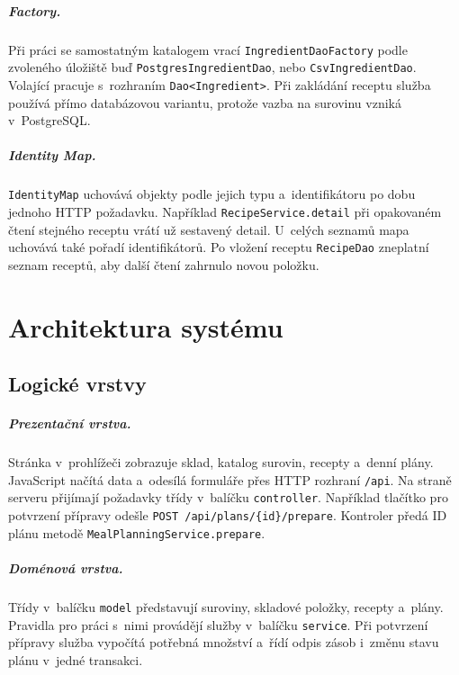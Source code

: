\documentclass[11pt,a4paper,oneside]{report}
\begin{document}
\paragraph{Factory.}
Při práci se samostatným katalogem vrací \texttt{IngredientDaoFactory}
podle zvoleného úložiště buď \texttt{PostgresIngredientDao}, nebo
\texttt{CsvIngredientDao}. Volající pracuje s~rozhraním
\texttt{Dao\textless Ingredient\textgreater}. Při zakládání receptu služba používá přímo
databázovou variantu, protože vazba na surovinu vzniká v~PostgreSQL.
\paragraph{Identity Map.}
\texttt{IdentityMap} uchovává objekty podle jejich typu a~identifikátoru
po dobu jednoho HTTP požadavku. Například \texttt{RecipeService.detail}
při opakovaném čtení stejného receptu vrátí už sestavený detail.
U~celých seznamů mapa uchovává také pořadí identifikátorů. Po vložení
receptu \texttt{RecipeDao} zneplatní seznam receptů, aby další čtení
zahrnulo novou položku.
\chapter{Architektura systému}
\section{Logické vrstvy}

\paragraph{Prezentační vrstva.}
Stránka v~prohlížeči zobrazuje sklad, katalog surovin, recepty a~denní
plány. JavaScript načítá data a~odesílá formuláře přes HTTP rozhraní
\texttt{/api}. Na straně serveru přijímají požadavky třídy v~balíčku
\texttt{controller}. Například tlačítko pro potvrzení přípravy odešle
\texttt{POST /api/plans/\{id\}/prepare}. Kontroler předá ID plánu
metodě \texttt{MealPlanningService.prepare}.

\paragraph{Doménová vrstva.}
Třídy v~balíčku \texttt{model} představují suroviny, skladové položky,
recepty a~plány. Pravidla pro práci s~nimi provádějí služby v~balíčku
\texttt{service}. Při potvrzení přípravy služba vypočítá potřebná
množství a~řídí odpis zásob i~změnu stavu plánu v~jedné transakci.
\end{document}
